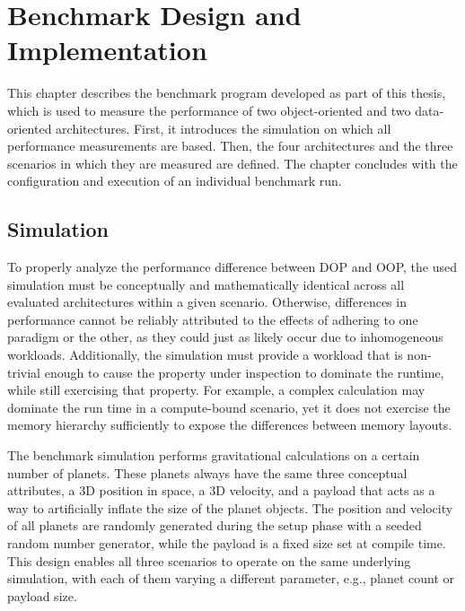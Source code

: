 
\cleardoubleoddpage
\chapter{Benchmark Design and Implementation}
\label{ch:benchmarks}
This chapter describes the benchmark program developed as part of this thesis, which is used to measure the performance of two object-oriented and two data-oriented architectures. First, it introduces the simulation on which all performance measurements are based. Then, the four architectures and the three scenarios in which they are measured are defined. The chapter concludes with the configuration and execution of an individual benchmark run.

\section{Simulation}
\label{sec:benchmarks:simulation}
To properly analyze the performance difference between \ac{DOP} and \ac{OOP}, the used simulation must be conceptually and mathematically identical across all evaluated architectures within a given scenario. Otherwise, differences in performance cannot be reliably attributed to the effects of adhering to one paradigm or the other, as they could just as likely occur due to inhomogeneous workloads. Additionally, the simulation must provide a workload that is non-trivial enough to cause the property under inspection to dominate the runtime, while still exercising that property. For example, a complex calculation may dominate the run time in a compute-bound scenario, yet it does not exercise the memory hierarchy sufficiently to expose the differences between memory layouts.

The benchmark simulation performs gravitational calculations on a certain number of planets. These planets always have the same three conceptual attributes, a 3D position in space, a 3D velocity, and a payload that acts as a way to artificially inflate the size of the planet objects. The position and velocity of all planets are randomly generated during the setup phase with a seeded random number generator, while the payload is a fixed size set at compile time. This design enables all three scenarios to operate on the same underlying simulation, with each of them varying a different parameter, e.g., planet count or payload size.

